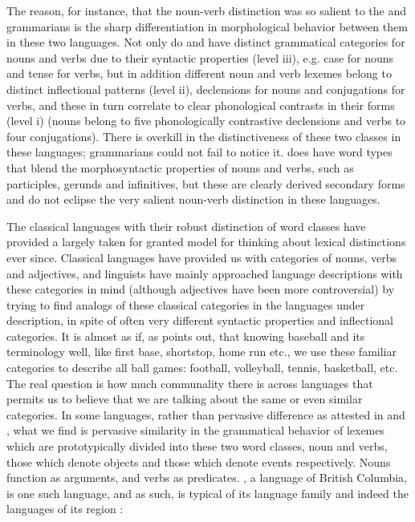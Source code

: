 \documentclass[output=paper]{langsci/langscibook}
\begin{document}
The reason, for instance, that the noun-verb distinction was so salient to the  and  grammarians is the sharp differentiation in morphological behavior between them in these two languages. Not only do  and  have distinct grammatical categories for nouns and verbs due to their syntactic properties (level iii), e.g. case for nouns and tense for verbs, but in addition different noun and verb lexemes belong to distinct inflectional patterns (level ii), declensions for nouns and conjugations for verbs, and these in turn correlate to clear phonological contrasts in their forms (level i) (nouns belong to five phonologically contrastive declensions and verbs to four conjugations). There is overkill in the distinctiveness of these two classes in these languages; grammarians could not fail to notice it.  does have word types that blend the morphosyntactic properties of nouns and verbs, such as participles, gerunds and infinitives, but these are clearly derived secondary forms and do not eclipse the very salient noun-verb distinction in these languages.

\newpage 
The classical languages with their robust distinction of word classes  have provided a largely taken for granted model for thinking about lexical distinctions ever since. Classical languages have provided us with categories of nouns, verbs and adjectives, and linguists have mainly approached language descriptions with these categories in mind (although adjectives have been more controversial) by trying to find analogs of these classical categories in the languages under description, in spite of often very different syntactic properties and inflectional categories. It is almost as if, as \citet{Riemer2010} points out, that knowing baseball and its terminology well, like first base, shortstop, home run etc., we use these familiar categories to describe all ball games: football, volleyball, tennis, basketball, etc. The real question is how much communality there is across languages that permits us to believe that we are talking about the same or even similar categories. In some languages, rather than pervasive difference as attested in  and , what we find is pervasive similarity in the grammatical behavior of lexemes which are prototypically divided into these two word classes, noun and verbs, those which denote objects and those which denote events respectively. Nouns function as arguments, and verbs as predicates. , a  language of British Columbia, is one such language, and as such, is typical of its language family and indeed the languages of its region \citep{DemirdacheEtAl1994}:
\end{document}
